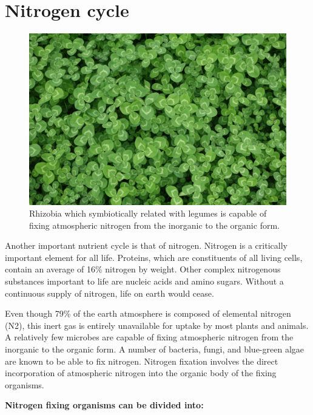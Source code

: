 \documentclass[]{book}
\begin{document}
\hypertarget{nitrogen-cycle}{%
\section{Nitrogen cycle}\label{nitrogen-cycle}}

\begin{figure}

{\centering \includegraphics[width=1\linewidth]{figures/clover} 

}

\caption{Rhizobia which symbiotically related with legumes is capable of fixing atmospheric nitrogen from the inorganic to the organic form.}\label{fig:clover}
\end{figure}

Another important nutrient cycle is that of nitrogen. Nitrogen is a critically important element for all life. Proteins, which are constituents of all living cells, contain an average of 16\% nitrogen by weight. Other complex nitrogenous substances important to life are nucleic acids and amino sugars. Without a continuous supply of nitrogen, life on earth would cease.

Even though 79\% of the earth atmosphere is composed of elemental nitrogen (N2), this inert gas is entirely unavailable for uptake by most plants and animals. A relatively few microbes are capable of fixing atmospheric nitrogen from the inorganic to the organic form. A number of bacteria, fungi, and blue-green algae are known to be able to fix nitrogen. Nitrogen fixation involves the direct incorporation of atmospheric nitrogen into the organic body of the fixing organisms.

\textbf{Nitrogen fixing organisms can be divided into:}
\end{document}
